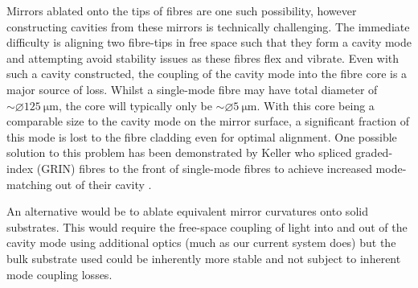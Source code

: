 \documentclass[../Thesis-IJspeert.tex]{subfiles}
\begin{document}
Mirrors ablated onto the tips of fibres are one such possibility, however constructing cavities from these mirrors is technically challenging.  The immediate difficulty is aligning two fibre-tips in free space such that they form a cavity mode and attempting avoid stability issues as these fibres flex and vibrate.  Even with such a cavity constructed, the coupling of the cavity mode into the fibre core is a major source of loss.  Whilst a single-mode fibre may have total diameter of ${\sim}\diameter\SI{125}{\um}$, the core will typically only be ${\sim}\diameter\SI{5}{\um}$.  With this core being a comparable size to the cavity mode on the mirror surface, a significant fraction of this mode is lost to the fibre cladding even for optimal alignment.  One possible solution to this problem has been demonstrated by Keller \etal{} who spliced graded-index (GRIN) fibres to the front of single-mode fibres to achieve increased mode-matching out of their cavity \cite{gulati17}.

An alternative would be to ablate equivalent mirror curvatures onto solid substrates.  This would require the free-space coupling of light into and out of the cavity mode using additional optics (much as our current system does) but the bulk substrate used could be inherently more stable and not subject to inherent mode coupling losses.
%
%
%
%
%
\end{document}
